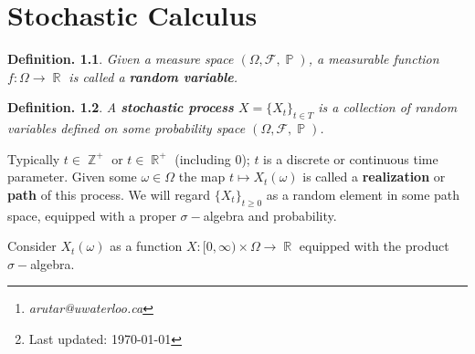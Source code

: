 \documentclass[11pt, a4paper]{memoir}
\title{\subject}
\author{Alex Rutar\thanks{\itshape arutar@uwaterloo.ca}\\ University of Waterloo}
\date{\semester\thanks{Last updated: \today}}
\DeclareMathOperator{\Z}{{\mathbb{Z}}}
\DeclareMathOperator{\R}{{\mathbb{R}}}
\theoremstyle{change}
\theoremstyle{plain}
\theoremstyle{nonumberplain}
\newtheorem{definition}{Definition.}
\DeclareMathOperator{\pr}{{\mathbb{P}}}
\newcommand{\defn}[1]{{\boldmath\bfseries #1}}
\numberwithin{equation}{section}
\begin{document}
\hypersetup{pageanchor=false}
\maketitle
\newpage
\frontmatter
\hypersetup{pageanchor=true}
\tableofcontents*
\newpage
\mainmatter


\chapter{Stochastic Calculus}
\begin{definition}
    Given a measure space $(\Omega,\mathcal{F},\pr)$, a measurable function $f:\Omega\to\R$ is called a \defn{random variable}.
\end{definition}
\begin{definition}
    A \defn{stochastic process} $X=\{X_t\}_{t\in T}$ is a collection of random variables defined on some probability space $(\Omega,\mathcal{F},\pr)$.
\end{definition}
Typically $t\in\Z^+$ or $t\in\R^+$ (including 0); $t$ is a discrete or continuous time parameter.
Given some $\omega\in\Omega$ the map $t\mapsto X_t(\omega)$ is called a \defn{realization} or \defn{path} of this process.
We will regard $\{X_t\}_{t\geq 0}$ as a random element in some path space, equipped with a proper $\sigma-$algebra and probability.

Consider $X_t(\omega)$ as a function $X:[0,\infty)\times\Omega\to \R$ equipped with the product $\sigma-$algebra.
\end{document}
